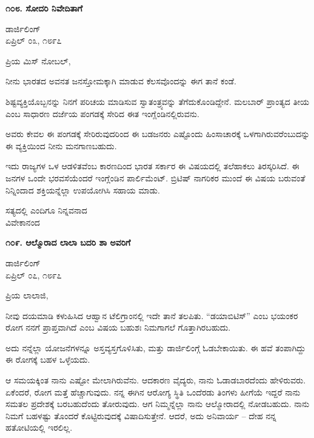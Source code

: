 \begin{center}
\textbf{೧೦೮. ಸೋದರಿ ನಿವೇದಿತಾಗೆ}
\end{center}

\begin{flushright}
ಡಾರ್ಜಿಲಿಂಗ್\\ಏಪ್ರಿಲ್ ೦೩, ೧೮೯೭
\end{flushright}

ಪ್ರಿಯ ಮಿಸ್ ನೋಬಲ್,

ನೀನು ಭಾರತದ ಅವನತ ಜನಸ್ತೋಮಕ್ಕಾಗಿ ಮಾಡುವ ಕೆಲಸವೊಂದನ್ನು ಈಗ ತಾನೆ ಕಂಡೆ.

ಶಿಷ್ಟವ್ಯಕ್ತಿಯೊಬ್ಬನನ್ನು ನಿನಗೆ ಪರಿಚಯ ಮಾಡಿಸುವ ಸ್ವಾತಂತ್ರ್ಯವನ್ನು ತೆಗೆದುಕೊಂಡಿದ್ದೇನೆ. ಮಲಬಾರ್ ಪ್ರಾಂತ್ಯದ ತೀಯ ಎಂಬ ಸಾಧಾರಣ ದರ್ಜೆಯ ಪಂಗಡಕ್ಕೆ ಸೇರಿದ ಈತ ಇಂಗ್ಲೆಂಡಿನಲ್ಲಿರುವನು.

ಅವರು ಕೇವಲ ಈ ಪಂಗಡಕ್ಕೆ ಸೇರಿರುವುದರಿಂದ ಈ ಬಡಜನರು ಎಷ್ಟೊಂದು ಹಿಂಸಾಚಾರಕ್ಕೆ ಒಳಗಾಗಿರುವರೆಂಬುದನ್ನು ಈ ವ್ಯಕ್ತಿಯಿಂದ ನೀನು ಮನಗಾಣಬಹುದು.

ಇದು ರಾಜ್ಯಗಳ ಒಳ ಆಡಳಿತವೆಂಬ ಕಾರಣದಿಂದ ಭಾರತ ಸರ್ಕಾರ ಈ ವಿಷಯದಲ್ಲಿ ತಲೆಹಾಕಲು ತಿರಸ್ಕರಿಸಿದೆ. ಈ ಜನಗಳ ಒಂದೇ ಭರವಸೆಯೆಂದರೆ ಇಂಗ್ಲೆಂಡಿನ ಪಾರ್ಲಿಮೆಂಟ್. ಬ್ರಿಟಿಷ್ ನಾಗರಿಕರ ಮುಂದೆ ಈ ವಿಷಯ ಬರುವಂತೆ ನಿನ್ನಿಂದಾದ ಶಕ್ತಿಯನ್ನೆಲ್ಲಾ ಉಪಯೋಗಿಸಿ ಸಹಾಯ ಮಾಡು.

\begin{flushright}
ಸತ್ಯದಲ್ಲಿ ಎಂದಿಗೂ ನಿನ್ನವನಾದ\\ವಿವೇಕಾನಂದ
\end{flushright}

\begin{center}
\textbf{೧೦೯. ಆಲ್ಮೊರಾದ ಲಾಲಾ ಬದರಿ ಶಾ ಅವರಿಗೆ}
\end{center}

\begin{flushright}
ಡಾರ್ಜಿಲಿಂಗ್\\ಏಪ್ರಿಲ್ ೦೭, ೧೮೯೭
\end{flushright}

ಪ್ರಿಯ ಲಾಲಾಜಿ,

ನೀವು ದಯಮಾಡಿ ಕಳುಹಿಸಿದ ಆಹ್ವಾನ ಟೆಲಿಗ್ರಾಂನಲ್ಲಿ ಇದೇ ತಾನೆ ತಲಪಿತು. “ಡಯಾಬಿಟಿಸ್” ಎಂಬ ಭಯಂಕರ ರೋಗ ನನಗೆ ಪ್ರಾಪ್ತವಾಗಿದೆ ಎಂಬ ವಿಷಯ ಬಹುಶಃ ನಿಮಗಾಗಲೆ ಗೊತ್ತಾಗಿರಬಹುದು.

ಅದು ನನ್ನೆಲ್ಲಾ ಯೋಜನೆಗಳನ್ನೂ ಅಸ್ತವ್ಯಸ್ತಗೊಳಿಸಿತು, ಮತ್ತು ಡಾರ್ಜಿಲಿಂಗ್ಗೆ ಓಡಬೇಕಾಯಿತು. ಈ ಹವೆ ತಂಪಾಗಿದ್ದು ಈ ರೋಗಕ್ಕೆ ಬಹಳ ಒಳ್ಳೆಯದು.

ಆ ಸಮಯಕ್ಕಿಂತ ನಾನು ಎಷ್ಟೋ ಮೇಲಾಗಿರುವೆನು. ಆದಕಾರಣ ವೈದ್ಯರು, ನಾನು ಓಡಾಡಬಾರದೆಂದು ಹೇಳಿರುವರು. ಏಕೆಂದರೆ, ರೋಗ ಮತ್ತೆ ಹೆಚ್ಚಾಗುವುದು. ನನ್ನ ಈಗಿನ ಆರೋಗ್ಯ ಸ್ಥಿತಿ ಒಂದೆರಡು ತಿಂಗಳು ಹೀಗೆಯೆ ಇದ್ದರೆ ನಾನು ಸಮತಲ ಪ್ರದೇಶಕ್ಕೆ ಬರಬಹುದೆಂದು ತೋರುವುದು. ಆಗ ನಿಮ್ಮನ್ನೆಲ್ಲಾ ನಾನು ಆಲ್ಮೋರಾದಲ್ಲಿ ನೋಡಬಹುದು. ನಾನು ನಿಮಗೆ ಬಹಳಷ್ಟು ತೊಂದರೆ ಕೊಟ್ಟಿರುವುದಕ್ಕೆ ವಿಷಾದಿಸುತ್ತೇನೆ. ಆದರೆ, ಅದು ಅನಿವಾರ್ಯ – ದೇಹ ನನ್ನ ಹತೋಟಿಯಲ್ಲಿ ಇರಲಿಲ್ಲ.

